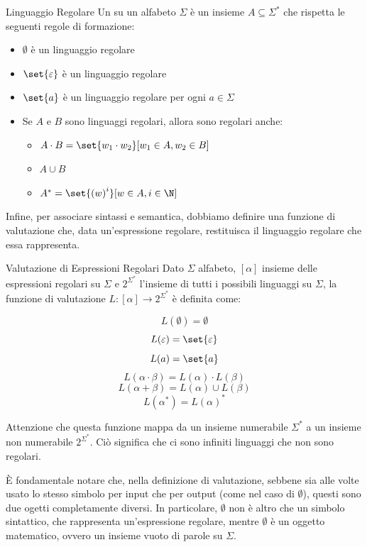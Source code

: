 \begin{definition}{Linguaggio Regolare}
  Un  su un alfabeto \(\Sigma\) è un insieme \(A \subseteq \Sigma^*\) che rispetta le seguenti regole di formazione:
  \begin{itemize}
    \item \(\emptyset\) è un linguaggio regolare
    \item \(\set{\varepsilon}\) è un linguaggio regolare
    \item \(\set{a}\) è un linguaggio regolare per ogni \(a \in \Sigma\)
    \item Se \(A\) e \(B\) sono linguaggi regolari, allora sono regolari anche:
          \begin{itemize}
            \item \(A \cdot B = \set{w_1 \cdot w_2}[w_1 \in A, w_2 \in B]\)
            \item \(A \cup B\)
            \item \(A^* = \set{{(w)}^i}[w \in A, i \in \N]\)
          \end{itemize}
  \end{itemize}
\end{definition}

Infine, per associare sintassi e semantica, dobbiamo definire una funzione di valutazione che, data un'espressione regolare, restituisca il linguaggio regolare che essa rappresenta.

\begin{definition}{Valutazione di Espressioni Regolari}
  Dato \(\Sigma\) alfabeto, \([\alpha]\) insieme delle espressioni regolari su \(\Sigma\) e \(2^{\Sigma^*}\) l'insieme di tutti i possibili linguaggi su \(\Sigma\), la funzione di valutazione \(L : [\alpha] \to 2^{\Sigma^*}\) è definita come:

  \[L(\emptyset) = \emptyset\]
  \[L(\varepsilon) = \set{\varepsilon}\]
  \[L(a) = \set{a}\]
  \[L(\alpha \cdot \beta) = L(\alpha) \cdot L(\beta)\]
  \[L(\alpha + \beta) = L(\alpha) \cup L(\beta)\]
  \[L(\alpha^*) = {L(\alpha)}^*\]
\end{definition}


\begin{note}{}
  Attenzione che questa funzione mappa da un insieme numerabile \(\Sigma^*\) a un insieme non numerabile \(2^{\Sigma^*}\). Ciò significa che ci sono infiniti linguaggi che non sono regolari.
\end{note}

\begin{note}{}
  È fondamentale notare che, nella definizione di valutazione, sebbene sia alle volte usato lo stesso simbolo per input che per output (come nel caso di \(\emptyset\)), questi sono due ogetti completamente diversi. In particolare,  \(\emptyset\) non è altro che un simbolo sintattico, che rappresenta un'espressione regolare, mentre  \(\emptyset\) è un oggetto matematico, ovvero un insieme vuoto di parole su \(\Sigma\).
\end{note}


